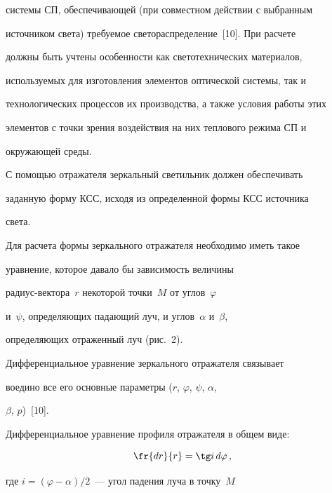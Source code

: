 системы СП, обеспечивающей (при совместном действии с выбранным 


источником света) требуемое светораспределение~[10]. При расчете 


должны быть учтены особенности как светотехнических материалов, 


используемых для изготовления элементов оптической системы, так и 


технологических процессов их производства, а также условия работы этих 


элементов с точки зрения воздействия на них теплового режима СП и 


окружающей среды.


  


  С помощью отражателя зеркальный светильник должен обеспечивать 


заданную форму КСС, исходя из определенной формы КСС источника 


света.


  


  Для расчета формы зеркального отражателя необходимо иметь такое 


уравнение, которое давало бы зависимость величины 


  ра\-ди\-ус-век\-то\-ра~$r$ некоторой точки~$M$ от углов~$\varphi$ 


и~$\psi$, определяющих падающий луч, и углов~$\alpha$ и~$\beta$, 


определяющих отраженный луч (рис.~2).


  


  Дифференциальное уравнение зеркального отражателя связывает 


воедино все его основные параметры ($r$, $\varphi$, $\psi$, $\alpha$, 


$\beta$, $p$)~[10].


  





  


  Дифференциальное уравнение профиля отражателя в общем виде:


  $$


  \fr{dr}{r}=\tg i \,d\varphi\,,


  $$


  где $i=(\varphi -\alpha)/2$~--- угол падения луча в точку~$M$ 


